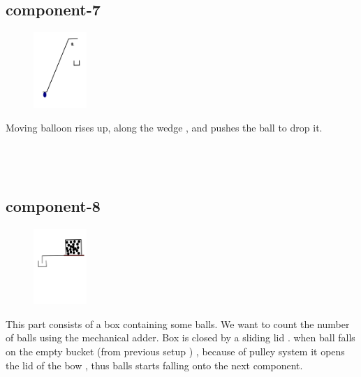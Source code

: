 \documentclass{article}
\begin{document}
\subsection{component-7}
\begin{figure}
    \centering
    \vspace{-20pt}
    \includegraphics[width=0.18\textwidth]{p7}
    \vspace{-20pt}
\end{figure}
Moving balloon rises up, along the wedge , and pushes the ball to drop it.
\\
\\
\\
\\

\subsection{component-8}
\begin{figure}
    \centering
    \vspace{-20pt}
    \includegraphics[width=0.18\textwidth]{p8}
    \vspace{-20pt}
\end{figure}
This part consists of a box containing some balls. We want to count the number of balls using the mechanical adder. Box is closed by a sliding lid .
when ball falls on the empty bucket (from previous setup ) , because of pulley system it opens the lid of the bow , thus balls starts falling onto the next component.
\\

\newpage
\end{document}
